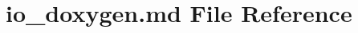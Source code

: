\hypertarget{io__doxygen_8md}{\section{io\-\_\-doxygen.\-md File Reference}
\label{io__doxygen_8md}
}
